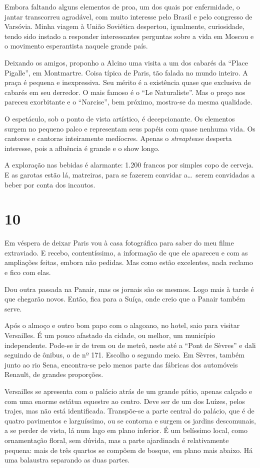 Embora faltando alguns elementos de proa, um dos quais por enfermidade, o jantar transcorreu agradável, com muito interesse pelo Brasil e pelo congresso de Varsóvia. Minha viagem à União Soviética despertou, igualmente, curiosidade, tendo sido instado a responder interessantes perguntas sobre a vida em Moscou e o movimento esperantista naquele grande país.

Deixando os amigos, proponho a Alcino uma visita a um dos cabarés da ``Place Pigalle'', em Montmartre. Coisa típica de Paris, tão falada no mundo inteiro. A praça é pequena e inexpressiva. Seu mérito é a existência quase que exclusiva de cabarés em seu derredor. O mais famoso é o ``Le Naturaliste''. Mas o preço nos pareceu exorbitante e o ``Narcise'', bem próximo, mostra-se da mesma qualidade.

O espetáculo, sob o ponto de vista artístico, é decepcionante. Os elementos surgem no pequeno palco e representam seus papéis com quase nenhuma vida. Os cantores e cantoras inteiramente medíocres. Apenas o \textit{streaptease} desperta interesse, pois a afluência é grande e o show longo.

A exploração nas bebidas é alarmante: 1.200 francos por simples copo de cerveja. E as garotas estão lá, matreiras, para se fazerem convidar a\ldots\ serem convidadas a beber por conta dos incautos.

\section*{10 \adfflatleafright {}}
Em véspera de deixar Paris vou à casa fotográfica para saber do meu filme extraviado. E recebo, contentíssimo, a informação de que ele apareceu e com as ampliações feitas, embora não pedidas. Mas como estão excelentes, nada reclamo e fico com elas.

Dou outra passada na Panair, mas os jornais são os mesmos. Logo mais à tarde é que chegarão novos. Então, fica para a Suíça, onde creio que a Panair também serve.

Após o almoço e outro bom papo com o alagoano, no hotel, saio para visitar Versailles. É um pouco afastado da cidade, ou melhor, um município independente. Pode-se ir de trem ou de metrô, neste até a ``Pont de Sèvres'' e dali seguindo de ônibus, o de nº 171. Escolho o segundo meio. Em Sèvres, também junto ao rio Sena, encontra-se pelo menos parte das fábricas dos automóveis Renault, de grandes proporções.

Versailles se apresenta com o palácio atrás de um grande pátio, apenas calçado e com uma enorme estátua equestre ao centro. Deve ser de um dos Luízes, pelos trajes, mas não está identificada. Transpõe-se a parte central do palácio, que é de quatro pavimentos e larguíssimo, ou se contorna e surgem os jardins descomunais, a se perder de vista, lá num lago em plano inferior. É um belíssimo local, como ornamentação floral, sem dúvida, mas a parte ajardinada é relativamente pequena: mais de três quartos se compõem de bosque, em plano mais abaixo. Há uma balaustra separando as duas partes.

